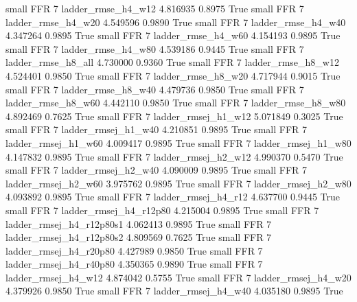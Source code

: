      small      FFR                 7       ladder_rmse_h4_w12   4.816935      0.8975    True
     small      FFR                 7       ladder_rmse_h4_w20   4.549596      0.9890    True
     small      FFR                 7       ladder_rmse_h4_w40   4.347264      0.9895    True
     small      FFR                 7       ladder_rmse_h4_w60   4.154193      0.9895    True
     small      FFR                 7       ladder_rmse_h4_w80   4.539186      0.9445    True
     small      FFR                 7       ladder_rmse_h8_all   4.730000      0.9360    True
     small      FFR                 7       ladder_rmse_h8_w12   4.524401      0.9850    True
     small      FFR                 7       ladder_rmse_h8_w20   4.717944      0.9015    True
     small      FFR                 7       ladder_rmse_h8_w40   4.479736      0.9850    True
     small      FFR                 7       ladder_rmse_h8_w60   4.442110      0.9850    True
     small      FFR                 7       ladder_rmse_h8_w80   4.892469      0.7625    True
     small      FFR                 7      ladder_rmsej_h1_w12   5.071849      0.3025    True
     small      FFR                 7      ladder_rmsej_h1_w40   4.210851      0.9895    True
     small      FFR                 7      ladder_rmsej_h1_w60   4.009417      0.9895    True
     small      FFR                 7      ladder_rmsej_h1_w80   4.147832      0.9895    True
     small      FFR                 7      ladder_rmsej_h2_w12   4.990370      0.5470    True
     small      FFR                 7      ladder_rmsej_h2_w40   4.090009      0.9895    True
     small      FFR                 7      ladder_rmsej_h2_w60   3.975762      0.9895    True
     small      FFR                 7      ladder_rmsej_h2_w80   4.093892      0.9895    True
     small      FFR                 7      ladder_rmsej_h4_r12   4.637700      0.9445    True
     small      FFR                 7   ladder_rmsej_h4_r12p80   4.215004      0.9895    True
     small      FFR                 7 ladder_rmsej_h4_r12p80s1   4.062413      0.9895    True
     small      FFR                 7 ladder_rmsej_h4_r12p80s2   4.809569      0.7625    True
     small      FFR                 7   ladder_rmsej_h4_r20p80   4.427989      0.9850    True
     small      FFR                 7   ladder_rmsej_h4_r40p80   4.350365      0.9890    True
     small      FFR                 7      ladder_rmsej_h4_w12   4.874042      0.5755    True
     small      FFR                 7      ladder_rmsej_h4_w20   4.379926      0.9850    True
     small      FFR                 7      ladder_rmsej_h4_w40   4.035180      0.9895    True
